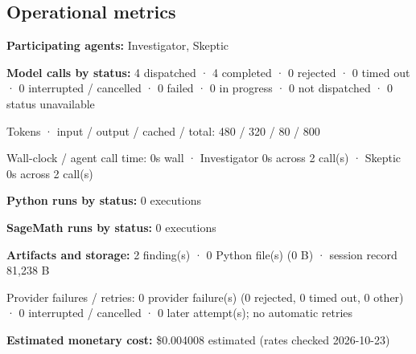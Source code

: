 \documentclass[11pt]{article}
\begin{document}
\subsection{Operational metrics}
\textbf{Participating agents:} Investigator, Skeptic\par
\textbf{Model calls by status:} 4 dispatched · 4 completed · 0 rejected · 0 timed out · 0 interrupted / cancelled · 0 failed · 0 in progress · 0 not dispatched · 0 status unavailable\par
Tokens · input / output / cached / total: 480 / 320 / 80 / 800\par
Wall-clock / agent call time: 0s wall · Investigator 0s across 2 call(s) · Skeptic 0s across 2 call(s)\par
\textbf{Python runs by status:} 0 executions\par
\textbf{SageMath runs by status:} 0 executions\par
\textbf{Artifacts and storage:} 2 finding(s) · 0 Python file(s) (0 B) · session record 81,238 B\par
Provider failures / retries: 0 provider failure(s) (0 rejected, 0 timed out, 0 other) · 0 interrupted / cancelled · 0 later attempt(s); no automatic retries\par
\textbf{Estimated monetary cost:} \$0.004008 estimated (rates checked 2026-10-23)\par
\end{document}
